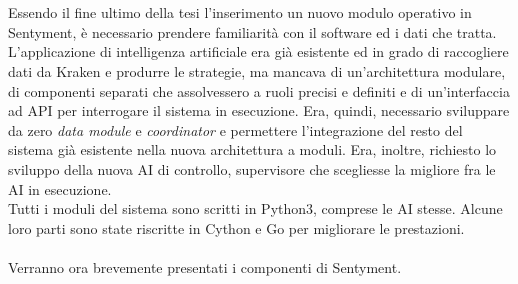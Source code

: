 \documentclass[a4paper,12pt]{report}
\begin{document}
\\~\\
Essendo il fine ultimo della tesi l'inserimento un nuovo modulo operativo in Sentyment, è necessario prendere familiarità con il software ed i dati che tratta.\\
L'applicazione di intelligenza artificiale era già esistente ed in grado di raccogliere dati da Kraken e produrre le strategie, ma mancava di un'architettura modulare, di componenti separati che assolvessero a ruoli precisi e definiti e di un'interfaccia ad API per interrogare il sistema in esecuzione. Era, quindi, necessario sviluppare da zero \textit{data module} e \textit{coordinator} e permettere l'integrazione del resto del sistema già esistente nella nuova architettura a moduli. Era, inoltre, richiesto lo sviluppo della nuova AI di controllo, supervisore che scegliesse la migliore fra le AI in esecuzione.\\
Tutti i moduli del sistema sono scritti in Python3, comprese le AI stesse. Alcune loro parti sono state riscritte in Cython e Go per migliorare le prestazioni.
\\~\\ Verranno ora brevemente presentati i componenti di Sentyment.
\end{document}
